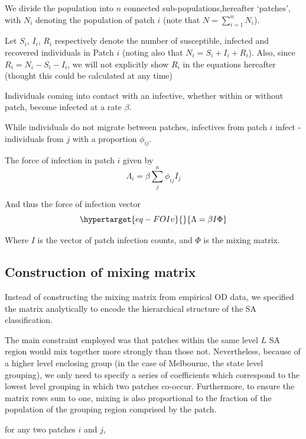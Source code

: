 \documentclass[
  letterpaper,
  DIV=11,
  numbers=noendperiod]{scrreprt}
\begin{document}
We divide the population into \(n\) connected sub-populations,hereafter
`patches', with \(N_i\) denoting the population of patch \(i\) (note
that \(N = \sum\limits_{i=1}^{n}N_i\)).

Let \(S_i\), \(I_i\), \(R_i\) respectively denote the number of
susceptible, infected and recovered individuals in Patch \(i\) (noting
also that \(N_i = S_i + I_i + R_i\)). Also, since
\(R_i = N_i - S_i - I_i\), we will not explicitly show \(R_i\) in the
equations hereafter (thought this could be calculated at any time)

Individuals coming into contact with an infective, whether within or
without patch, become infected at a rate \(\beta\).

While individuals do not migrate between patches, infectives from patch
\(i\) infect - individuals from \(j\) with a proportion \(\phi_{ij}\).

The force of infection in patch \(i\) given by \[
\Lambda_i = \beta \sum\limits_{j}^{n}\phi_{ij}I_j
\]

And thus the force of infection vector
\begin{equation}\protect\hypertarget{eq-FOIv}{}{\Lambda = \beta I \Phi}\label{eq-FOIv}\end{equation}

Where \(I\) is the vector of patch infection counts, and \(\Phi\) is the
mixing matrix.

\hypertarget{construction-of-mixing-matrix}{%
\subsection{Construction of mixing
matrix}\label{construction-of-mixing-matrix}}

Instead of constructing the mixing matrix from empirical OD data, we
specified the matrix analytically to encode the hierarchical structure
of the SA classification.

The main constraint employed was that patches within the same level
\(L\) SA region would mix together more strongly than those not.
Nevertheless, because of a higher level enclosing group (in the case of
Melbourne, the state level grouping), we only need to specify a series
of coefficients which correspond to the lowest level grouping in which
two patches co-occur. Furthermore, to ensure the matrix rows sum to one,
mixing is also proportional to the fraction of the population of the
grouping region comprised by the patch.

for any two patches \(i\) and \(j\),
\end{document}
